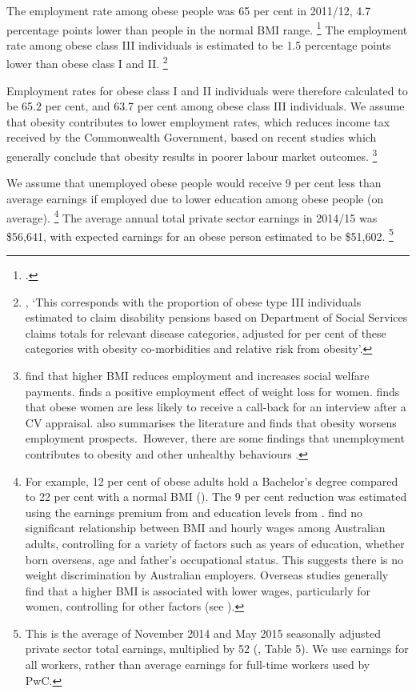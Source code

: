 \documentclass[embargoed]{grattan}
\begin{document}
The employment rate among obese people was 65 per cent in 2011/12, 4.7 percentage points lower than people in the normal BMI range.%
\footcite{ABS2013436405503AustralianHealth} The employment rate among obese class III individuals is estimated to be 1.5 percentage points lower than obese class I and II.%
\footnote{\textcite[][59]{PwC2015Weighingcostobesity}, `This corresponds with the proportion of obese type III individuals estimated to claim disability pensions based on Department of Social Services claims totals for relevant disease categories, adjusted for per cent of these categories with obesity co-morbidities and relative risk from obesity'.}

Employment rates for obese class I and II individuals were therefore calculated to be 65.2 per cent, and 63.7 per cent among obese class III individuals.
We assume that obesity contributes to lower employment rates, which reduces income tax received by the Commonwealth Government, based on recent studies which generally conclude that obesity results in poorer labour market outcomes.%
\footnote{\textcite{Boeckerman2016EffectWeightLabor} find that higher BMI reduces employment and increases social welfare payments. \textcite{Reichert2015Obesityweightloss} finds a positive employment effect of weight loss for women. \textcite{Rooth2009Obesityattractivenessdifferential} finds that obese women are less likely to receive a call-back for an interview after a CV appraisal. \textcite{Cawley2015economyscalesselective} also summarises the literature and finds that obesity worsens employment prospects.~However, there are some findings that unemployment contributes to obesity and other unhealthy behaviours \textcites{Schmeiser2009Expandingwalletswaistlines}{Marcus2014Doesjobloss}.}

We assume that unemployed obese people would receive 9 per cent less than average earnings if employed due to lower education among obese people (on average).%
\footnote{For example, 12 per cent of obese adults hold a Bachelor’s degree compared to 22 per cent with a normal BMI (\textcite{ABS20164364055011AustralianHealth}).
The 9 per cent reduction was estimated using the earnings premium from \textcite{Norton2012MappingAustralianhigher} and education levels from \textcite{ABS2013436405503AustralianHealth}. \textcite{Kortt2010Doessizematter} find no significant relationship between BMI and hourly wages among Australian adults, controlling for a variety of factors such as years of education, whether born overseas, age and father’s occupational status.
This suggests there is no weight discrimination by Australian employers.
Overseas studies generally find that a higher BMI is associated with lower wages, particularly for women, controlling for other factors (see \textcites{Cawley2004impactobesitywages}{Cawley2005comparisonrelationshipobesity}).} 
The average annual total private sector earnings in 2014/15 was \$56,641, with expected earnings for an obese person estimated to be \$51,602.%
\footnote{This is the average of November 2014 and May 2015 seasonally adjusted private sector total earnings, multiplied by 52 (\textcite{ABS201663020AverageWeekly}, Table 5).
We use earnings for all workers, rather than average earnings for full-time workers used by PwC.}  
\end{document}
